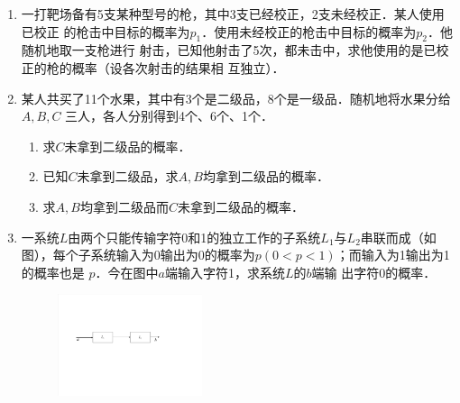 \documentclass[10pt,a4paper]{article}
\begin{document}
\begin{enumerate}





        






    \item 一打靶场备有5支某种型号的枪，其中3支已经校正，2支未经校正．某人使用已校正
    的枪击中目标的概率为$p_1$．使用未经校正的枪击中目标的概率为$p_2$．他随机地取一支枪进行
    射击，已知他射击了5次，都未击中，求他使用的是已校正的枪的概率（设各次射击的结果相
    互独立）．
    \clearpage




    \item 某人共买了11个水果，其中有3个是二级品，8个是一级品．随机地将水果分给$A,B,C$
    三人，各人分别得到4个、6个、1个．
    \begin{enumerate}
        \item 求$C$未拿到二级品的概率．
        \item 已知$C$未拿到二级品，求$A,B$均拿到二级品的概率．
        \item 求$A,B$均拿到二级品而$C$未拿到二级品的概率．
    \end{enumerate}
    \clearpage


    \item 一系统$L$由两个只能传输字符0和1的独立工作的子系统$L_1$与$L_2$串联而成（如
    图），每个子系统输入为0输出为0的概率为$p(0<p<1)$；而输入为1输出为1的概率也是
    $p$．今在图中$a$端输入字符1，求系统$L$的$b$端输
    出字符0的概率．
    \begin{figure}[H]
        \flushright 
        \includegraphics[width=0.4\textwidth]{3.pdf}
    \end{figure}
    \vspace{-0.5cm}
    \clearpage




\end{enumerate}
\end{document}
